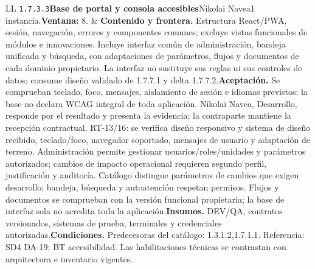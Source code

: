 \begin{longtable}{L{\tabcolsep\relax}L{\tabcolsep\relax}}
\texttt{1.\allowbreak{}7.\allowbreak{}3.\allowbreak{}3}\newline{}\textbf{Base de portal y consola accesibles}\newline{}Nikolai Navea\newline{}1 instancia.\newline{}\textbf{Ventana:} 8. & \textbf{Contenido y frontera.} Estructura React/PWA, sesión, navegación, errores y componentes comunes; excluye vistas funcionales de módulos e innovaciones. Incluye interfaz común de administración, bandeja unificada y búsqueda, con adaptaciones de parámetros, flujos y documentos de cada dominio propietario. La interfaz no sustituye sus reglas ni sus controles de datos; consume diseño validado de 1.7.7.1 y delta 1.7.7.2.\newline{}\textbf{Aceptación.} Se comprueban teclado, foco, mensajes, aislamiento de sesión e idiomas previstos; la base no declara WCAG integral de toda aplicación. Nikolai Navea, Desarrollo, responde por el resultado y presenta la evidencia; la contraparte mantiene la recepción contractual. RT-13/16: se verifica diseño responsivo y sistema de diseño recibido, teclado/foco, navegador soportado, mensajes de usuario y adaptación de terreno. Administración permite gestionar usuarios/roles/unidades y parámetros autorizados; cambios de impacto operacional requieren segundo perfil, justificación y auditoría. Catálogo distingue parámetros de cambios que exigen desarrollo; bandeja, búsqueda y autoatención respetan permisos. Flujos y documentos se comprueban con la versión funcional propietaria; la base de interfaz sola no acredita toda la aplicación.\newline{}\textbf{Insumos.} DEV/QA, contratos versionados, sistemas de prueba, terminales y credenciales autorizadas.\newline{}\textbf{Condiciones.} Predecesoras del catálogo: 1.3.1.2,1.7.1.1. Referencia: SD4 DA-19; BT accesibilidad. Las habilitaciones técnicas se contrastan con arquitectura e inventario vigentes.\\\hline

\end{longtable}

